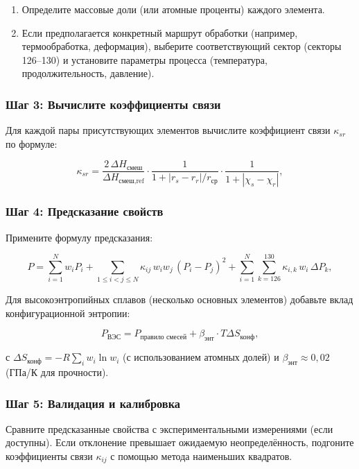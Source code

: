 \documentclass[12pt,a4paper]{article}
\begin{document}
	\begin{enumerate}
		\item Определите массовые доли (или атомные проценты) каждого элемента.
		\item Если предполагается конкретный маршрут обработки (например, термообработка, деформация), выберите соответствующий сектор (секторы 126–130) и установите параметры процесса (температура, продолжительность, давление).
	\end{enumerate}
	
	\subsubsection{Шаг 3: Вычислите коэффициенты связи}
	
	Для каждой пары присутствующих элементов вычислите коэффициент связи \(\kappa_{sr}\) по формуле:
	
	\[
	\kappa_{sr} = \frac{2\,\Delta H_{\text{смеш}}}{\Delta H_{\text{смеш,ref}}} \cdot
	\frac{1}{1 + |r_s - r_r|/r_{\text{ср}}} \cdot
	\frac{1}{1 + |\chi_s - \chi_r|},
	\]
	
	\subsubsection{Шаг 4: Предсказание свойств}
	
	Примените формулу предсказания:
	
	\[
	P = \sum_{i=1}^{N} w_i P_i
	+ \sum_{1\le i<j\le N} \kappa_{ij}\, w_i w_j\, (P_i - P_j)^2
	+ \sum_{i=1}^{N} \sum_{k=126}^{130} \kappa_{i,k}\, w_i\, \Delta P_k,
	\]
	
	Для высокоэнтропийных сплавов (несколько основных элементов) добавьте вклад конфигурационной энтропии:
	
	\[
	P_{\text{ВЭС}} = P_{\text{правило смесей}} + \beta_{\text{энт}} \cdot T \Delta S_{\text{конф}},
	\]
	
	с \(\Delta S_{\text{конф}} = -R \sum_i w_i \ln w_i\) (с использованием атомных долей) и \(\beta_{\text{энт}} \approx 0,02\) (ГПа/К для прочности).
	
	\subsubsection{Шаг 5: Валидация и калибровка}
	
	Сравните предсказанные свойства с экспериментальными измерениями (если доступны). Если отклонение превышает ожидаемую неопределённость, подгоните коэффициенты связи \(\kappa_{ij}\) с помощью метода наименьших квадратов.
	
\end{document}
